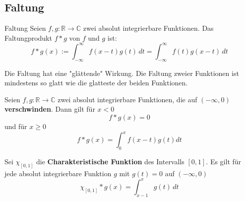 \documentclass[a4paper,10pt]{article}
\begin{document}
\subsection{Faltung}

\begin{mainbox}{Faltung}
  Seien \(f,g\colon\mathbb{R}\to\mathbb{C}\) zwei absolut integrierbare Funktionen. Das Faltungprodukt \(f\ast g\) von \(f\) und \(g\) ist: \begin{equation*} f\ast g(x):=\int_{-\infty}^\infty f(x-t)g(t)\,dt =\int_{-\infty}^\infty f(t)g(x-t)\,dt \end{equation*}
\end{mainbox}

Die Faltung hat eine "glättende" Wirkung. Die Faltung zweier Funktionen ist mindestens so glatt wie die glatteste der beiden Funktionen.

Seien \(f,g\colon\mathbb{R}\to\mathbb{C}\) zwei absolut integrierbare Funktionen, die auf \((-\infty,0)\) \textbf{verschwinden}. Dann gilt für \(x<0\) \begin{equation*} f*g(x)=0 \end{equation*} und für \(x\geq0\) \begin{equation*} f*g(x) = \int_0^x f(x-t)g(t) dt \end{equation*}

Sei \(\chi_{[0,1]}\) die \textbf{Charakteristische Funktion} des Intervalls \([0,1]\). Es gilt für jede absolut integrierbare Funktion \(g\) mit \(g(t)=0\) auf \((-\infty,0)\) \begin{equation*} \chi_{[0,1]}*g(x)=\int_{x-1}^x g(t)\,dt \end{equation*}
\end{document}
